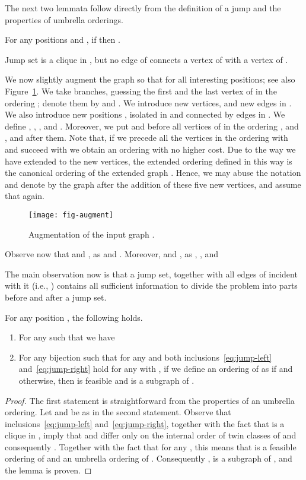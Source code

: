 The next two lemmata follow directly from the definition of a jump and the properties
of  umbrella orderings.
\begin{lemma}\label{lem:jump-ineq}
For any positions  and , if  then .
\end{lemma}
\begin{lemma}\label{lem:jump-cut} Jump set 
 is  a clique in , but no edge of 
connects a vertex of  with a vertex of .
\end{lemma}

We now slightly augment the graph  so that  for all interesting
positions; see also Figure~\ref{fig:augment}.
We take  branches, guessing the first
and the last vertex of  in the ordering ; denote them by  and .
We introduce  new vertices,  
and new edges  in .
We also introduce new positions , isolated in  and connected
by edges  in .
We define , , ,
    and .
Moreover, we put  and  before all vertices of  in the ordering ,
and ,  and  after them.
Note that, if we precede all the vertices in the ordering  with
 and succeed with  we obtain an ordering with no
higher cost. Due to the way we have extended  to the new vertices, the
extended ordering  defined in this way is the canonical ordering
of the extended graph . Hence, we may abuse the notation and denote by 
the graph after the addition of these five new vertices, and assume that  again.

\begin{figure}
\centering
\texttt{[image: fig-augment]}
\caption{Augmentation of the input graph .}
\label{fig:augment}
\end{figure}


Observe now that  and ,
 as  and .
Moreover,  and ,
as , , and 

The main observation now is that a jump set, together with all edges of 
incident with it (i.e., ) contains
all sufficient information to divide the problem into parts before and after
a jump set.
\begin{lemma}\label{lem:jump-equiv}
For any position , the following holds.
\begin{enumerate}
\item
For any  such that  we have

\item For any bijection 
such that  for any  and 
both inclusions~\eqref{eq:jump-left} and~\eqref{eq:jump-right} hold
for any  with ,
if we define an ordering  of  as
 if  and  otherwise,
then  is feasible and  is a subgraph of . 
\end{enumerate}
\end{lemma}
\begin{proof}
The first statement is straightforward from the properties of an umbrella ordering.
Let  and  be as in the second statement.
Observe that inclusions~\eqref{eq:jump-left} and~\eqref{eq:jump-right}, together with the fact that  is a clique in ,
imply that  and  differ only on the internal order of twin classes of  and consequently .
Together with the fact that  for any , this means that  is a feasible ordering of  and an umbrella ordering of .
Consequently ,  is a subgraph of , and the lemma is proven.
\end{proof}


